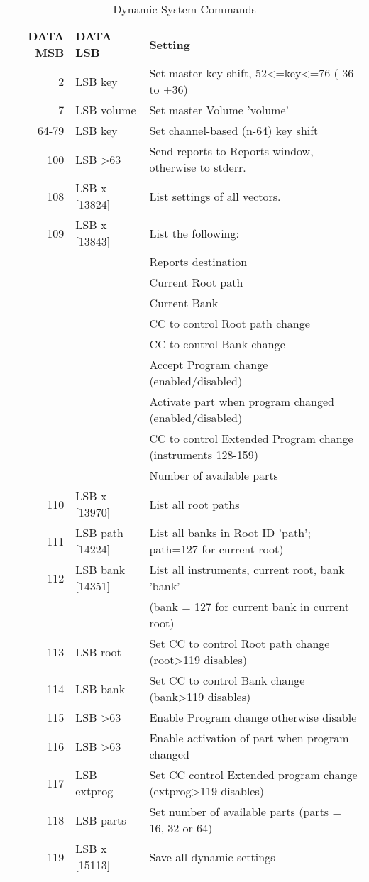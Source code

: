    \begin{table}[H]
      \centering
      \caption{Dynamic System Commands}
      \label{table:dynamic_system_commands}
      \begin{tabular}{r l l}

\textbf{DATA MSB} & \textbf{DATA LSB} & \textbf{Setting} \\

  2 & LSB key       & Set master key shift, 52\textless=key\textless=76
                      (-36 to +36) \\
  7 & LSB volume    & Set master Volume 'volume' \\
  64-79 & LSB key   & Set channel-based (n-64) key shift \\
100 & LSB \textgreater 63 & Send reports to Reports window, otherwise to stderr. \\
108 & LSB x [13824] & List settings of all vectors. \\
109 & LSB x [13843] & List the following: \\
    & &             Reports destination \\
    & &             Current Root path \\
    & &             Current Bank \\
    & &             CC to control Root path change \\
    & &             CC to control Bank change \\
    & &             Accept Program change (enabled/disabled) \\
    & &             Activate part when program changed (enabled/disabled) \\
    & &             CC to control Extended Program change (instruments 128-159) \\
    & &             Number of available parts \\
110 & LSB x [13970]      & List all root paths \\
111 & LSB path [14224]   & List all banks in Root ID 'path';
                           path=127 for current root) \\
112 & LSB bank [14351]   & List all instruments, current root, bank 'bank' \\
    & &                       (bank = 127 for current bank in current root) \\
113 & LSB root      & Set CC to control Root path change (root\textgreater 119 disables) \\
114 & LSB bank      & Set CC to control Bank change (bank\textgreater 119 disables) \\
115 & LSB \textgreater 63      & Enable Program change otherwise disable \\
116 & LSB \textgreater 63      & Enable activation of part when program changed \\
117 & LSB extprog   & Set CC control Extended program change
                        (extprog\textgreater 119 disables) \\
118 & LSB parts     & Set number of available parts (parts = 16, 32 or 64) \\
119 & LSB x  [15113]  &  Save all dynamic settings \\


\end{tabular}
\end{table}
